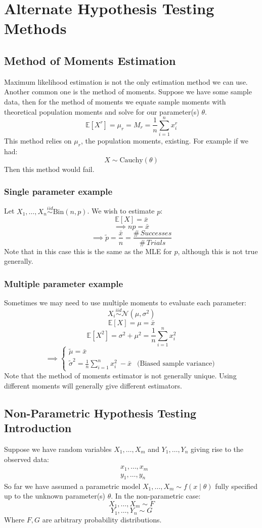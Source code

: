 \documentclass[12pt]{article}
\newcommand{\iid}{\overset{iid}{\sim}}
\begin{document}
\section{Alternate Hypothesis Testing Methods}
\subsection{Method of Moments Estimation}
Maximum likelihood estimation is not the only estimation method we can use. Another common one is the method of moments. Suppose we have some sample data, then for the method of moments we equate sample moments with theoretical population moments and solve for our parameter(s) \(\theta\).
\[\mathbb{E}[X^r]=\mu_r=M_r=\frac{1}{n}\sum^n_{i=1}x_i^r\]
This method relies on \(\mu_r\), the population moments, existing. For example if we had:
\[X\sim\text{Cauchy}(\theta)\]
Then this method would fail.
\subsubsection{Single parameter example}
Let \(X_1,\dots,X_n\iid\text{Bin}(n,p)\). We wish to estimate \(p\):
\[\mathbb{E}[X]=\bar{x}\]
\[\implies np=\bar{x}\]
\[\implies \tilde{p}=\frac{\bar{x}}{n}=\frac{\#\, Successes}{\#\, Trials}\]
Note that in this case this is the same as the MLE for \(p\), although this is not true generally.
\subsubsection{Multiple parameter example}
Sometimes we may need to use multiple moments to evaluate each parameter:
\[X_i\iid\mathcal{N}(\mu,\sigma^2)\]
\[\mathbb{E}[X]=\mu=\bar{x}\]
\[\mathbb{E}[X^2]=\sigma^2+\mu^2=\frac{1}{n}\sum^n_{i=1}x_i^2\]
\[\implies\begin{cases}
    \tilde{\mu}=\bar{x} \\
    \tilde{\sigma}^2=\frac{1}{n}\sum^n_{i=1}x_i^2\  -\bar{x} & \text{(Biased sample variance)}
\end{cases}\]
Note that the method of moments estimator is not generally unique. Using different moments will generally give different estimators.
\subsection{Non-Parametric Hypothesis Testing Introduction}
Suppose we have random variables \(X_1,\dots,X_m\) and \(Y_1,\dots,Y_n\) giving rise to the observed data:
\begin{align*}
    &x_1,\dots,x_m \\
    &y_1,\dots,y_n
\end{align*}
So far we have assumed a parametric model \(X_1,\dots,X_m\sim f(x\mid \theta)\) fully specified up to the unknown parameter(s) \(\theta\). In the non-parametric case:
\[X_1,\dots,X_m\sim F\]
\[Y_1,\dots,Y_n\sim G\]
Where \(F,G\) are arbitrary probability distributions.
\end{document}
